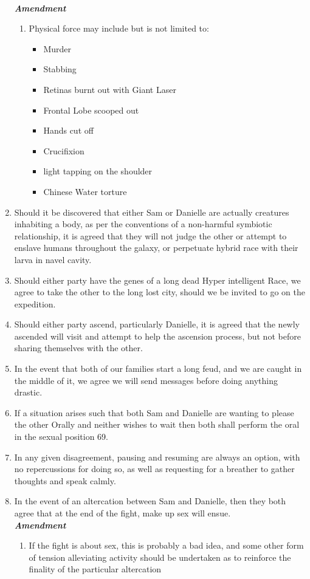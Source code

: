 \begin{enumerate}
  \\ \textbf{\emph{Amendment}}
  \begin{enumerate}
    \item Physical force may include but is not limited to: 
    \begin{itemize}
      	\item  Murder
		\item  Stabbing
		\item  Retinas burnt out with Giant Laser
		\item  Frontal Lobe scooped out
		\item  Hands cut off
		\item  Crucifixion
		\item  light tapping on the shoulder
		\item  Chinese Water torture  
    \end{itemize}
  \end{enumerate}
  \setcounter{enumi}{52}
  \item Should it be discovered that either Sam or Danielle are actually creatures inhabiting a body, 
  as per the conventions of a non-harmful symbiotic relationship, it is agreed that they will not judge the other or 
  attempt to enslave humans throughout the galaxy, or perpetuate hybrid race with their larva in navel cavity.
  \item Should either party have the genes of a long dead Hyper intelligent Race, we agree to take the other to the 
  long lost city, should we be invited to go on the expedition.
  \item Should either party ascend, particularly Danielle, it is agreed that the newly ascended will visit and attempt 
  to help the ascension process, but not before sharing themselves with the other.
  \item In the event that both of our families start a long feud, and we are caught in the middle of it, we agree we will 
  send messages before doing anything drastic.
  \setcounter{enumi}{68}
  \item If a situation arises such that both Sam and Danielle are wanting to please the other Orally and neither wishes 
  to wait then both shall perform the oral in the sexual position 69.
  \setcounter{enumi}{70}
  \item In any given disagreement, pausing and resuming are always an option, with no repercussions for doing so, as well 
  as requesting for a breather to gather thoughts and speak calmly.
  \item In the event of an altercation between Sam and Danielle, then they both agree that at the end of the fight, make up sex will ensue.
  \\ \textbf{\emph{Amendment}}
  \begin{enumerate}
    \item If the fight is about sex, this is probably a bad idea, and some other form of tension alleviating activity should be undertaken as to 
    reinforce the finality of the particular altercation
  \end{enumerate}
 \end{enumerate}
